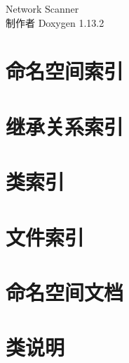 \documentclass[twoside]{book}
\newcommand{\+}{\discretionary{\mbox{\scriptsize$\hookleftarrow$}}{}{}}
\newcommand{\clearemptydoublepage}{%
    \newpage{\pagestyle{empty}\cleardoublepage}%
  }
\begin{document}
  \raggedbottom
  \begin{CJK}{UTF8}{gbsn}
    \hypersetup{pageanchor=false,
                bookmarksnumbered=true,
                pdfencoding=unicode
               }
  \begin{titlepage}
  \vspace*{7cm}
  \begin{center}%
  {\Large Network Scanner}\\
  \vspace*{1cm}
  {\large 制作者 Doxygen 1.13.2}\\
  \end{center}
  \end{titlepage}
  \clearemptydoublepage
  \tableofcontents
  \clearemptydoublepage
  \hypersetup{pageanchor=true}


\chapter{命名空间索引}

\chapter{继承关系索引}

\chapter{类索引}

\chapter{文件索引}

\chapter{命名空间文档}

\chapter{类说明}



















\end{CJK}
\end{document}
